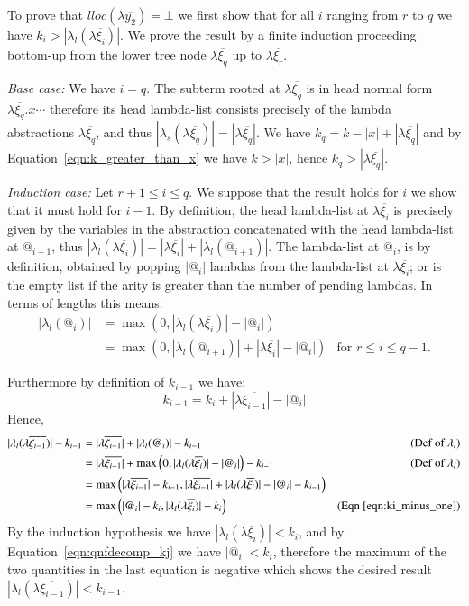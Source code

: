 \documentclass{elsarticle}
\theoremstyle{plain}
\theoremstyle{definition}
\begin{document}
\begin{enumerate}
To prove that $lloc(\lambda\overline{y_2}) =\bot$ we first show that for all $i$ ranging from $r$ to $q$ we have
 $k_i>|\lambda_l(\lambda\overline{\xi_i})|$. We prove the result by a finite induction proceeding bottom-up from the lower tree node
 $\lambda\overline{\xi_q}$ up to $\lambda\overline{\xi_r}$.

\emph{Base case:} We have $i=q$. The subterm
rooted at $\lambda\overline{\xi_q}$ is in head normal form
$\lambda\overline{\xi_q}. x \cdots$ therefore its head lambda-list consists precisely of the lambda abstractions $\lambda\overline{\xi_q}$, and thus
$|\lambda_s(\lambda\overline{\xi_q})| = |\lambda\overline{\xi_q}|$.
We have $k_q = k -|x| + |\lambda\overline{\xi_q}|$ and by Equation~\ref{eqn:k_greater_than_x} we have $k>|x|$, hence $k_q >|\lambda\overline{\xi_q}|$.


\emph{Induction case:} Let $r+1\leq i \leq q$. We suppose that the result holds for $i$ we show that it must hold for $i-1$. By definition, the head lambda-list at $\lambda\overline{\xi_i}$ is precisely given by the variables in the abstraction concatenated with the head lambda-list at $@_{i+1}$, thus $|\lambda_l(\lambda\overline{\xi_i})| =
|\lambda\overline{\xi_i}| + |\lambda_l(@_{i+1})|$. The lambda-list at $@_i$, is by definition, obtained by popping $|@_i|$ lambdas from the lambda-list at $\lambda\overline{\xi_i}$; or is the empty list if the arity is greater than the number of pending lambdas. In terms of lengths this means:
\begin{align*}
    |\lambda_l(@_i)| &= \max(0, |\lambda_l(\lambda\overline{\xi_i})| - |@_i|) \\
     &= \max\left( 0, |\lambda_l(@_{i+1})| + |\lambda\overline{\xi_i}| - |@_i| \right) & \mbox{for $r\leq i \leq q-1$.}
\end{align*}

Furthermore by definition of $k_{i-1}$ we have:
\begin{equation}
k_{i-1} = k_i + |\lambda\overline{\xi_{i-1}}| - |@_i| \label{eqn:ki_minus_one}
\end{equation}
Hence,
\begin{align*}
    |\lambda_l(\lambda\overline{\xi_{i-1}})| - k_{i-1}
    &= |\lambda\overline{\xi_{i-1}}| +|\lambda_l(@_i)| - k_{i-1} &\mbox{(Def~of $\lambda_l$)}\\
    &= |\lambda\overline{\xi_{i-1}}| + \max\left( 0, |\lambda_l(\lambda\overline{\xi_i})| - |@_i| \right) - k_{i-1} &\mbox{(Def~of $\lambda_l$)}\\
    &= \max\left( |\lambda\overline{\xi_{i-1}}| - k_{i-1},    |\lambda\overline{\xi_{i-1}}| + |\lambda_l(\lambda\overline{\xi_i})| - |@_i| - k_{i-1} \right) \\
    &= \max\left(  |@_i|- k_i, |\lambda_l(\lambda\overline{\xi_i})| - k_i \right) &\mbox{(Eqn~\ref{eqn:ki_minus_one})}
\end{align*}
By the induction hypothesis we have $|\lambda_l(\lambda\overline{\xi_i})| < k_i$, and by Equation~\ref{eqn:qnfdecomp_kj} we have $ |@_i|< k_i$, therefore the maximum of the two quantities in the last equation is negative which shows
the desired result $|\lambda_l(\lambda\overline{\xi_{i-1}})| < k_{i-1}$.


\end{enumerate}
\end{document}

